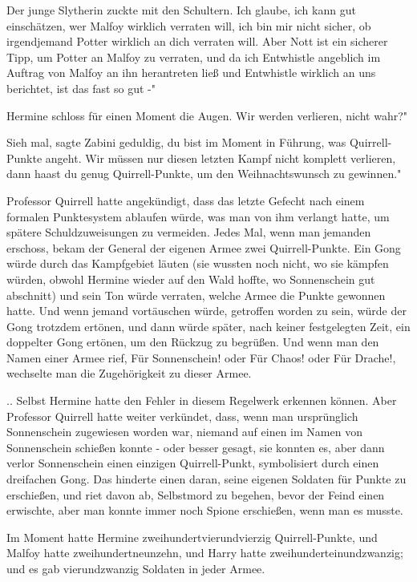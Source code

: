 Der junge Slytherin zuckte mit den Schultern. \glqq Ich glaube, ich kann gut
einschätzen, wer Malfoy wirklich verraten will, ich bin mir nicht sicher, ob
irgendjemand Potter wirklich an dich verraten will. Aber Nott ist ein sicherer
Tipp, um Potter an Malfoy zu verraten, und da ich Entwhistle angeblich im
Auftrag von Malfoy an ihn herantreten ließ und Entwhistle wirklich an uns
berichtet, ist das fast so gut -"

Hermine schloss für einen Moment die Augen. \glqq Wir werden verlieren, nicht
wahr?"

\glqq Sieh mal\grqq{}, sagte Zabini geduldig, \glqq du bist im Moment in
Führung, was Quirrell-Punkte angeht. Wir müssen nur diesen letzten Kampf nicht
komplett verlieren, dann haast du genug Quirrell-Punkte, um den Weihnachtswunsch
zu gewinnen."

Professor Quirrell hatte angekündigt, dass das letzte Gefecht nach einem
formalen Punktesystem ablaufen würde, was man von ihm verlangt hatte, um spätere
Schuldzuweisungen zu vermeiden. Jedes Mal, wenn man jemanden erschoss, bekam der
General der eigenen Armee zwei Quirrell-Punkte. Ein Gong würde durch das
Kampfgebiet läuten (sie wussten noch nicht, wo sie kämpfen würden, obwohl
Hermine wieder auf den Wald hoffte, wo Sonnenschein gut abschnitt) und sein Ton
würde verraten, welche Armee die Punkte gewonnen hatte. Und wenn jemand
vortäuschen würde, getroffen worden zu sein, würde der Gong trotzdem ertönen,
und dann würde später, nach keiner festgelegten Zeit, ein doppelter Gong
ertönen, um den Rückzug zu begrüßen. Und wenn man den Namen einer Armee rief,
\glqq Für Sonnenschein!\grqq{} oder \glqq Für Chaos!\grqq{} oder \glqq Für
Drache!\grqq{}, wechselte man die Zugehörigkeit zu dieser Armee.

.. Selbst Hermine hatte den Fehler in diesem Regelwerk erkennen können. Aber
Professor Quirrell hatte weiter verkündet, dass, wenn man ursprünglich
Sonnenschein zugewiesen worden war, niemand auf einen im Namen von Sonnenschein
schießen konnte - oder besser gesagt, sie konnten es, aber dann verlor
Sonnenschein einen einzigen Quirrell-Punkt, symbolisiert durch einen dreifachen
Gong. Das hinderte einen daran, seine eigenen Soldaten für Punkte zu erschießen,
und riet davon ab, Selbstmord zu begehen, bevor der Feind einen erwischte, aber
man konnte immer noch Spione erschießen, wenn man es musste.

Im Moment hatte Hermine zweihundertvierundvierzig Quirrell-Punkte, und Malfoy
hatte zweihundertneunzehn, und Harry hatte zweihunderteinundzwanzig; und es gab
vierundzwanzig Soldaten in jeder Armee.

